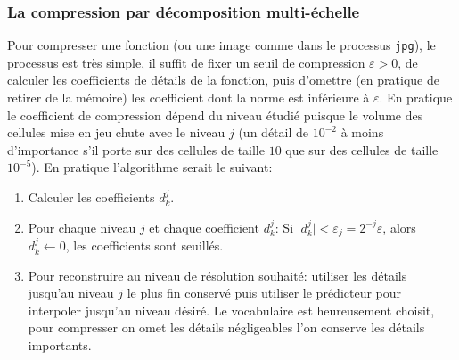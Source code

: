     \subsubsection{La compression par décomposition multi-échelle}
            Pour compresser une fonction (ou une image comme dans le processus \texttt{jpg}), le processus est très simple, il suffit de fixer un seuil de compression $\varepsilon > 0$,
            de calculer les coefficients de détails de la fonction, 
            puis d'omettre (en pratique de retirer de la mémoire) les coefficient dont la norme est inférieure à $\varepsilon$.
            En pratique le coefficient de compression dépend du niveau étudié puisque le volume des cellules mise en jeu chute avec le niveau $j$
            (un détail de $10^{-2}$ à moins d'importance s'il porte sur des cellules de taille $10$ que sur des cellules de taille $10^{-5}$).
            En pratique l'algorithme serait le suivant:
            \begin{enumerate}  
                \item Calculer les coefficients $d_k^j$.
                \item Pour chaque niveau $j$ et chaque coefficient $d_k^j$: Si $\vert d_k^j \vert < \varepsilon_j = 2^{-j}\varepsilon$, alors $d_k^j\leftarrow 0$, les coefficients sont seuillés.
                \item[] Pour reconstruire au niveau de résolution souhaité: utiliser les détails jusqu'au niveau $j$ le plus fin conservé puis utiliser le prédicteur 
                pour interpoler jusqu'au niveau désiré. Le vocabulaire est heureusement choisit, pour compresser on omet les détails négligeables l'on conserve les détails importants.
            \end{enumerate}
